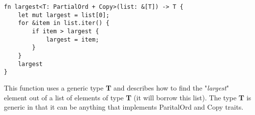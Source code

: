 \begin{verbatim}
fn largest<T: PartialOrd + Copy>(list: &[T]) -> T {
    let mut largest = list[0];
    for &item in list.iter() {
        if item > largest {
            largest = item;
        }
    }
    largest
}
\end{verbatim}

This function uses a generic type \textbf{T} and describes how to find the "\emph{largest}" element out of a list of elements of type \textbf{T} (it will borrow this list). The type \textbf{T} is generic in that it can be anything that implements ParitalOrd and Copy traits.

